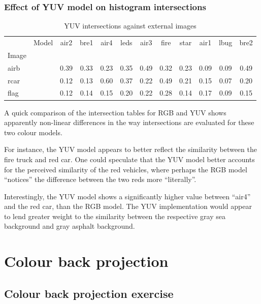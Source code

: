 \documentclass[abstract=true]{scrartcl}
\begin{document}
        \subsubsection{Effect of YUV model on histogram intersections}

\begin{table}
    \begin{tabular}{l l | *{10}{c}}

              &Model&air2&bre1&air4&leds&air3&fire&star&air1&lbug&bre2\\  
        Image &     &    &    &    &    &    &    &    &    &    &    \\  
        \hline
        airb  &     &0.39&0.33&0.23&0.35&0.49&0.32&0.23&0.09&0.09&0.49\\
        rcar  &     &0.12&0.13&0.60&0.37&0.22&0.49&0.21&0.15&0.07&0.20\\
        flag  &     &0.12&0.14&0.15&0.20&0.22&0.28&0.14&0.17&0.09&0.15 

    \end{tabular}
    \caption{YUV intersections against external images}
\end{table}

            A quick comparison of the intersection tables for RGB and YUV shows
            apparently non-linear differences in the way intersections are
            evaluated for these two colour models.

            For instance, the YUV model appears to better reflect the similarity
            between the fire truck and red car. One could speculate that the YUV
            model better accounts for the perceived similarity of the red
            vehicles, where perhaps the RGB model ``notices'' the difference
            between the two reds more ``literally''.

            Interestingly, the YUV model shows a significantly higher value
            between ``air4'' and the red car, than the RGB model. The YUV
            implementation would appear to lend greater weight to the similarity
            between the respective gray sea background and gray asphalt
            background.

\section{Colour back projection}

    \subsection{Colour back projection exercise}
        
\end{document}
